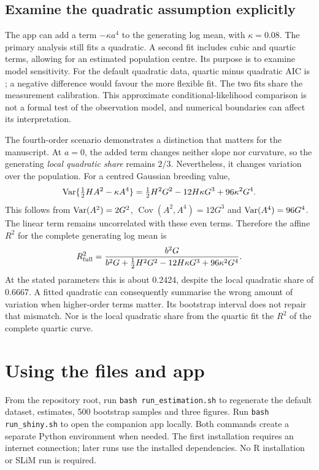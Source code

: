 \documentclass[11pt]{article}
\begin{document}
\subsection{Examine the quadratic assumption explicitly}
The app can add a term $-\kappa a^4$ to the generating log mean, with $\kappa=0.08$. The primary analysis still fits a quadratic. A second fit includes cubic and quartic terms, allowing for an estimated population centre. Its purpose is to examine model sensitivity. For the default quadratic data, quartic minus quadratic AIC is \AICDifference; a negative difference would favour the more flexible fit. The two fits share the measurement calibration. This approximate conditional-likelihood comparison is not a formal test of the observation model, and numerical boundaries can affect its interpretation.

The fourth-order scenario demonstrates a distinction that matters for the manuscript. At $a=0$, the added term changes neither slope nor curvature, so the generating \emph{local quadratic share} remains $2/3$. Nevertheless, it changes variation over the population. For a centred Gaussian breeding value,
\begin{equation}
 \operatorname{Var}\{\tfrac12HA^2-\kappa A^4\}
 =\tfrac12H^2G^2-12H\kappa G^3+96\kappa^2G^4.
 \label{eq:quarticvar}
\end{equation}
This follows from $\operatorname{Var}(A^2)=2G^2$, $\operatorname{Cov}(A^2,A^4)=12G^3$ and $\operatorname{Var}(A^4)=96G^4$. The linear term remains uncorrelated with these even terms. Therefore the affine $R^2$ for the complete generating log mean is
\begin{equation}
 R^2_{\rm full}=\frac{b^2G}{b^2G+\tfrac12H^2G^2-12H\kappa G^3+96\kappa^2G^4}.
 \label{eq:quarticR2}
\end{equation}
At the stated parameters this is about 0.2424, despite the local quadratic share of 0.6667. A fitted quadratic can consequently summarise the wrong amount of variation when higher-order terms matter. Its bootstrap interval does not repair that mismatch. Nor is the local quadratic share from the quartic fit the $R^2$ of the complete quartic curve.

\section{Using the files and app}

From the repository root, run \texttt{bash run\_estimation.sh} to regenerate the default dataset, estimates, 500 bootstrap samples and three figures. Run \texttt{bash run\_shiny.sh} to open the companion app locally. Both commands create a separate Python environment when needed. The first installation requires an internet connection; later runs use the installed dependencies. No R installation or SLiM run is required.
\end{document}
